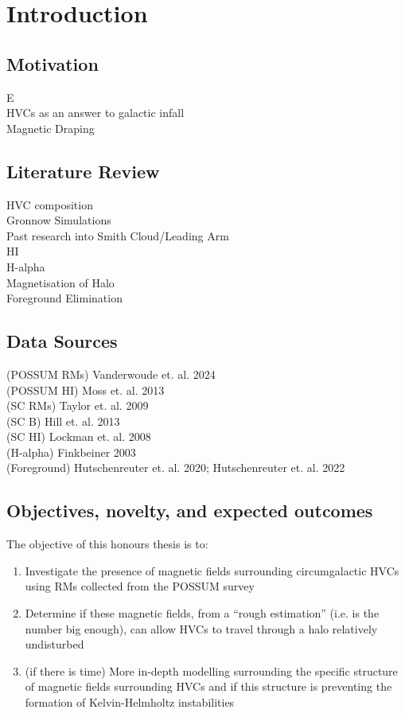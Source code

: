 \chapter{Introduction}
\label{cha:introduction}

\section{Motivation}
\label{sec:motivation}
E~\cite{ID33} \\
HVCs as an answer to galactic infall \\
Magnetic Draping

\section{Literature Review}
\label{sec:lit-review}
HVC composition \\
Gronnow Simulations \\
Past research into Smith Cloud/Leading Arm \\
HI \\
H-alpha \\
Magnetisation of Halo \\
Foreground Elimination


\section{Data Sources}
\label{sec:sources}
(POSSUM RMs) Vanderwoude et. al. 2024 \\
(POSSUM HI) Moss et. al. 2013 \\
(SC RMs) Taylor et. al. 2009 \\
(SC B) Hill et. al. 2013 \\
(SC HI) Lockman et. al. 2008 \\
(H-alpha) Finkbeiner 2003 \\
(Foreground) Hutschenreuter et. al. 2020; Hutschenreuter et. al. 2022

\section{Objectives, novelty, and expected outcomes}
\label{sec:objectives}

The objective of this honours thesis is to:
\begin{enumerate}
\item Investigate the presence of magnetic fields surrounding circumgalactic HVCs using RMs collected from the POSSUM survey
\item Determine if these magnetic fields, from a “rough estimation” (i.e. is the number big enough), can allow HVCs to travel through a halo relatively undisturbed
\item (if there is time) More in-depth modelling surrounding the specific structure of magnetic fields surrounding HVCs and if this structure is preventing the formation of Kelvin-Helmholtz instabilities
\end{enumerate}

